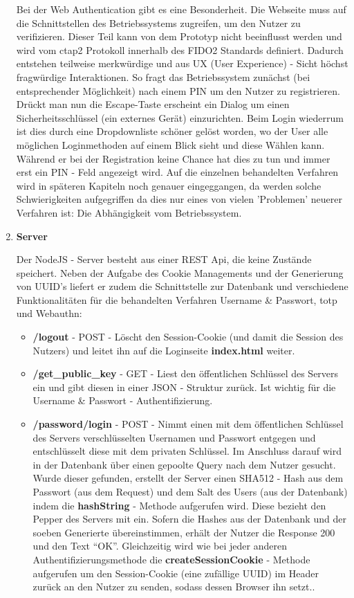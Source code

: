 \begin{enumerate}
Bei der Web Authentication gibt es eine Besonderheit. Die Webseite muss auf die Schnittstellen des Betriebssystems zugreifen, um den Nutzer zu verifizieren. Dieser Teil kann von dem Prototyp nicht beeinflusst werden und wird vom \ac{ctap}2 Protokoll innerhalb des FIDO2 Standards definiert. Dadurch entstehen teilweise merkwürdige und aus UX (User Experience) - Sicht höchst fragwürdige Interaktionen. So fragt das Betriebssystem zunächst (bei entsprechender Möglichkeit) nach einem PIN um den Nutzer zu registrieren. Drückt man nun die Escape-Taste erscheint ein Dialog um einen Sicherheitsschlüssel (ein externes Gerät) einzurichten. Beim Login wiederrum ist dies durch eine Dropdownliste schöner gelöst worden, wo der User alle möglichen Loginmethoden auf einem Blick sieht und diese Wählen kann. Während er bei der Registration keine Chance hat dies zu tun und immer erst ein PIN - Feld angezeigt wird. Auf die einzelnen behandelten Verfahren wird in späteren Kapiteln noch genauer eingeggangen, da werden solche Schwierigkeiten aufgegriffen da dies nur eines von vielen 'Problemen' neuerer Verfahren ist: Die Abhängigkeit vom Betriebssystem.

\item \textbf{Server}

Der NodeJS - Server besteht aus einer REST Api, die keine Zustände speichert. Neben der Aufgabe des Cookie Managements und der Generierung von UUID's liefert er zudem die Schnittstelle zur Datenbank und verschiedene Funktionalitäten für die behandelten Verfahren Username \& Passwort, \ac{totp} und Webauthn:

\begin{itemize}
 \item \textbf{/logout} - POST - Löscht den Session-Cookie (und damit die Session des Nutzers) und leitet ihn auf die Loginseite \textbf{index.html} weiter.

 \item \textbf{/get\_public\_key} - GET - Liest den öffentlichen Schlüssel des Servers ein und gibt diesen in einer JSON - Struktur zurück. Ist wichtig für die Username \& Passwort - Authentifizierung.

 \item \textbf{/password/login} - POST - Nimmt einen mit dem öffentlichen Schlüssel des Servers verschlüsselten Usernamen und Passwort entgegen und entschlüsselt diese mit dem privaten Schlüssel. Im Anschluss darauf wird in der Datenbank über einen gepoolte Query nach dem Nutzer gesucht. Wurde dieser gefunden, erstellt der Server einen SHA512 - Hash aus dem Passwort (aus dem Request) und dem Salt des Users (aus der Datenbank) indem die \textbf{hashString} - Methode aufgerufen wird. Diese bezieht den Pepper des Servers mit ein. Sofern die Hashes aus der Datenbank und der soeben Generierte übereinstimmen, erhält der Nutzer die Response 200 und den Text ``OK''. Gleichzeitig wird wie bei jeder anderen Authentifizierungsmethode die \textbf{createSessionCookie} - Methode aufgerufen um den Session-Cookie (eine zufällige UUID) im Header zurück an den Nutzer zu senden, sodass dessen Browser ihn setzt..
 \newpage
 

\end{itemize}
\end{enumerate}
